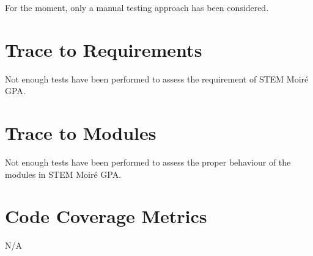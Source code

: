 \documentclass[12pt, titlepage]{article}
\newcommand{\progname}{STEM Moir{\'e} GPA}
\begin{document}
For the moment, only a manual testing approach has been considered.

\section{Trace to Requirements}

Not enough tests have been performed to assess the requirement of \progname{}.
		
\section{Trace to Modules}

Not enough tests have been performed to assess the proper behaviour of the modules in \progname{}.		

\section{Code Coverage Metrics}

N/A




\end{document}
